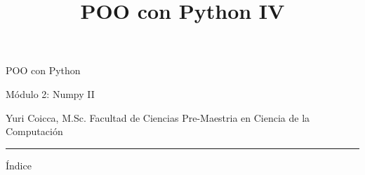 \documentclass[11pt]{article}
\title{POO con Python IV}
\begin{document}
    
    
    \maketitle
    
    

    
    \section{}\label{section}

POO con Python

Módulo 2: Numpy II

Yuri Coicca, M.Sc. Facultad de Ciencias Pre-Maestria en Ciencia de la
Computación

    \begin{center}\rule{0.5\linewidth}{\linethickness}\end{center}

Índice
\end{document}
